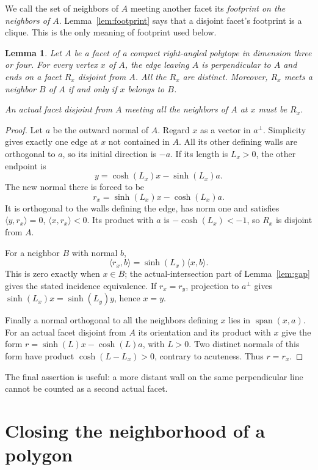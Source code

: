 \documentclass[11pt]{article}
\newtheorem{lemma}[theorem]{Lemma}
\theoremstyle{remark}
\newcommand{\ip}[2]{\langle #1,#2\rangle}
\begin{document}
We call the set of neighbors of $A$ meeting another facet its
\emph{footprint on the neighbors of $A$}. Lemma~\ref{lem:footprint}
says that a disjoint facet's footprint is a clique. This is the only
meaning of footprint used below.

\begin{lemma}\label{lem:opposite}
Let $A$ be a facet of a compact right-angled polytope in dimension three
or four. For every vertex $x$ of $A$, the edge leaving $A$ is perpendicular
to $A$ and ends on a facet $R_x$ disjoint from $A$. All the $R_x$ are
distinct. Moreover, $R_x$ meets a neighbor $B$ of $A$ if and only if $x$
belongs to $B$.

An actual facet disjoint from $A$ meeting all the neighbors of $A$ at
$x$ must be $R_x$.
\end{lemma}
\begin{proof}
Let $a$ be the outward normal of $A$. Regard $x$ as a vector in
$a^\perp$. Simplicity gives exactly one edge at $x$ not contained in
$A$. All its other defining walls are orthogonal to $a$, so its initial
direction is $-a$. If its length is $L_x>0$, the other endpoint is
\[
 y=\cosh(L_x)x-\sinh(L_x)a.
\]
The new normal there is forced to be
\begin{equation}\label{eq:opposite-normal}
 r_x=\sinh(L_x)x-\cosh(L_x)a.
\end{equation}
It is orthogonal to the walls defining the edge, has norm one and
satisfies $\ip{y}{r_x}=0$, $\ip{x}{r_x}<0$. Its product with $a$ is
$-\cosh(L_x)<-1$, so $R_x$ is disjoint from $A$.

For a neighbor $B$ with normal $b$,
\[
 \ip{r_x}{b}=\sinh(L_x)\ip{x}{b}.
\]
This is zero exactly when $x\in B$; the actual-intersection part of
Lemma~\ref{lem:gap} gives the stated incidence equivalence. If $r_x=r_y$,
projection to $a^\perp$ gives
$\sinh(L_x)x=\sinh(L_y)y$, hence $x=y$.

Finally a normal orthogonal to all the neighbors defining $x$ lies in
$\operatorname{span}(x,a)$. For an actual facet disjoint from $A$ its
orientation and its product with $x$ give the form
$r=\sinh(L)x-\cosh(L)a$, with $L>0$. Two distinct normals of this form
have product $\cosh(L-L_x)>0$, contrary to acuteness. Thus $r=r_x$.
\end{proof}

The final assertion is useful: a more distant wall on the same
perpendicular line cannot be counted as a second actual facet.

\section{Closing the neighborhood of a polygon}
\end{document}

